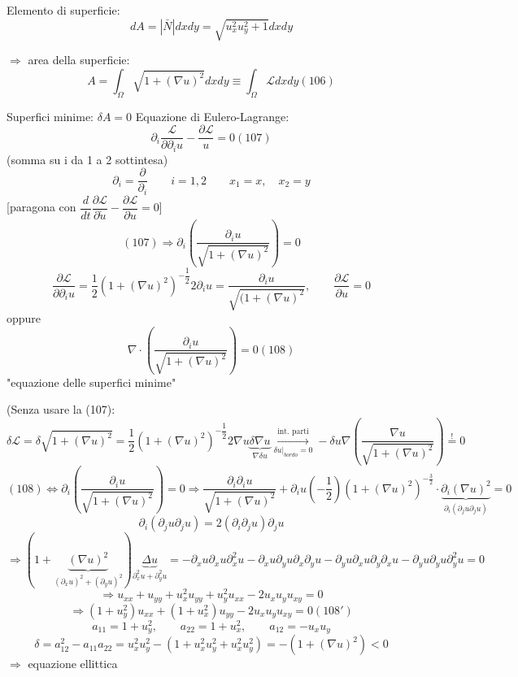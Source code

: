 \documentclass[a4paper,11pt]{report}
\begin{document}
Elemento di superficie:
$$
dA = |\bar{N}|dxdy=\sqrt{u_x^2 u_y^2 +1}dxdy 
$$

$\Rightarrow$ area della superficie:
\begin{equation}
A=\int_{\Omega} \sqrt{1+(\nabla u)^2} dxdy\equiv \int_{\Omega} \mathcal{L}dxdy (106)
\end{equation}

Superfici minime: $\delta A=0$
Equazione di Eulero-Lagrange:
\begin{equation}
\partial_i \dfrac{\mathcal{L}}{\partial \partial_i u}-\dfrac{\partial \mathcal{L}}{u}=0 (107)
\end{equation}
(somma su i da 1 a 2 sottintesa)
$$
\partial_i=\dfrac{\partial}{\partial_i} \qquad i=1,2 \qquad x_1=x,\quad x_2=y
$$
[paragona con $\dfrac{d}{dt}\dfrac{\partial \mathcal{L}}{\partial \dot{u}}-\dfrac{\partial\mathcal{L}}{\partial u}=0$]
$$
(107)\Rightarrow \partial_i \left( \dfrac{\partial_i u}{\sqrt{1+(\nabla u)^2}}\right)=0
$$
$$
\dfrac{\partial\mathcal{L}}{\partial \partial_i u} = \dfrac{1}{2}(1 +(\nabla u)^2)^{-\dfrac{1}{2}} 2\partial_i u=\dfrac{\partial_i u}{\sqrt{(1+(\nabla u)^2}}, \qquad \dfrac{\partial \mathcal{L}}{\partial u}=0 
$$
oppure
\begin{equation}
\nabla \cdot \left( \dfrac{\partial_i u}{\sqrt{1+(\nabla u)^2}}\right)=0 (108)
\end{equation}
"equazione delle superfici minime"

(Senza usare la (107):
$$
\delta\mathcal{L}=\delta\sqrt{1+(\nabla u)^2}=\dfrac{1}{2}\left(1+(\nabla u)^2\right)^{-\dfrac{1}{2}}2\nabla u \underset{\nabla \delta u}{\underbrace{\delta\nabla u}} \overset{\text{int. parti}}{\underset{\delta u|_{bordo}=0}{\longrightarrow}}
 -\delta u \nabla \left(\dfrac{\nabla u}{\sqrt{1+(\nabla u)^2}}\right)\overset{!}{=}0
$$
$$
(108)\Leftrightarrow \partial_i \left( \dfrac{\partial_i u}{\sqrt{1+(\nabla u)^2}}\right) =0 \Rightarrow \dfrac{\partial_i \partial_i u}{\sqrt{1+(\nabla u)^2}} + \partial_i u \left(-\dfrac{1}{2}\right) (1+(\nabla u)^2)^{-\frac{3}{2}} \cdot \underset{\partial_i(\partial_j u \partial_j u)}{\underbrace{\partial_i (\nabla u)^2}} =0
$$
$$
\partial_i(\partial_j u \partial_j u)=2(\partial_i\partial_j u)\partial_j u 
$$
$$
\Rightarrow (1+\underset{(\partial_x u)^2 + (\partial_y u)^2}{\underbrace{(\nabla u)^2}})\underset{\partial_x^2 u + \partial_y^2 u}{\underbrace{\Delta u}} =- \partial_x u \partial_x u \partial_x^2 u - \partial_x u\partial_y u \partial_x\partial_y u - \partial_yu \partial_x u \partial_y \partial_x u - \partial_y u\partial_y u \partial_y^2 u =0
$$
$$
\Rightarrow u_{xx} + u_{yy} + u_x^2 u_{yy} + u_y^2 u_{xx} - 2u_xu_y u_{xy}=0
$$
\begin{equation}
\Rightarrow (1+u_y^2)u_{xx} + (1+u_x^2) u_{yy} - 2u_x u_y u_{xy}=0 (108')
\end{equation}
$$
a_{11}=1+u_y^2, \qquad a_{22}=1+u_x^2, \qquad a_{12}=-u_x u_y
$$
$$
\delta = a_{12}^2 -a_{11}a_{22} = u_x^2 u_y^2 - (1+u_x^2 u_y^2 + u_x^2u_y^2)=-(1+(\nabla u)^2) <0
$$
$\Rightarrow$  equazione ellittica
\end{document}
